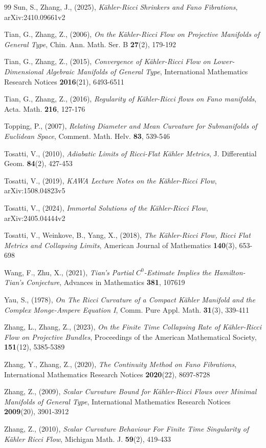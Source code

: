 \documentclass[12pt]{article}
\numberwithin{equation}{section}
\begin{document}
\begin{thebibliography}{99}
 Sun, S., Zhang, J., (2025),
\textit{K\"ahler-Ricci Shrinkers and Fano Fibrations},
arXiv:2410.09661v2 

 Tian, G., Zhang, Z., (2006),
\textit{On the K\"ahler-Ricci Flow on Projective Manifolds of General Type}, 
Chin. Ann. Math. Ser. B \textbf{27}(2), 179-192

 Tian, G., Zhang, Z., (2015), 
\textit{Convergence of K\"ahler-Ricci Flow on Lower-Dimensional Algebraic Manifolds of General Type}, 
International Mathematics Research Notices \textbf{2016}(21), 6493-6511

 Tian, G., Zhang, Z., (2016), 
\textit{Regularity of K\"ahler-Ricci flows on Fano manifolds},
Acta. Math. \textbf{216}, 127-176 

 Topping, P., (2007), 
\textit{Relating Diameter and Mean Curvature for Submanifolds of Euclidean Space},
Comment. Math. Helv. \textbf{83}, 539-546

 Tosatti, V., (2010), 
\textit{Adiabatic Limits of Ricci-Flat K\"ahler Metrics}, 
J. Differential Geom. \textbf{84}(2), 427-453

 Tosatti, V., (2019), 
\textit{KAWA Lecture Notes on the K\"ahler-Ricci Flow}, 
arXiv:1508.04823v5

 Tosatti, V., (2024), 
\textit{Immortal Solutions of the K\"ahler-Ricci Flow},  arXiv:2405.04444v2

 Tosatti, V., Weinkove, B., Yang, X., (2018), 
\textit{The K\"ahler-Ricci Flow, Ricci Flat Metrics and Collapsing Limits}, 
American Journal of Mathematics \textbf{140}(3), 653-698

 Wang, F., Zhu, X., (2021), 
\textit{Tian’s Partial $C^0$-Estimate Implies the Hamilton-Tian’s Conjecture}, 
Advances in Mathematics \textbf{381}, 107619

 Yau, S., (1978), 
\textit{On The Ricci Curvature of a Compact K\"ahler Manifold and the Complex Monge-Ampere Equation I}, 
Comm. Pure Appl. Math. \textbf{31}(3), 339-411

 Zhang, L., Zhang, Z., (2023), 
\textit{On the Finite Time Collapsing Rate of K\"ahler-Ricci Flow on Projective Bundles}, 
Proceedings of the American Mathematical Society, \textbf{151}(12), 5385-5389

 Zhang, Y., Zhang, Z., (2020), 
\textit{The Continuity Method on Fano Fibrations}, 
International Mathematics Research Notices \textbf{2020}(22), 8697-8728

 Zhang, Z., (2009), 
\textit{Scalar Curvature Bound for K\"ahler-Ricci Flows over Minimal Manifolds of General Type}, 
International Mathematics Research Notices \textbf{2009}(20), 3901-3912

 Zhang, Z., (2010), 
\textit{Scalar Curvature Behaviour For Finite Time Singularity of K\"ahler Ricci Flow}, 
Michigan Math. J. \textbf{59}(2), 419-433

\end{thebibliography}
\end{document}
